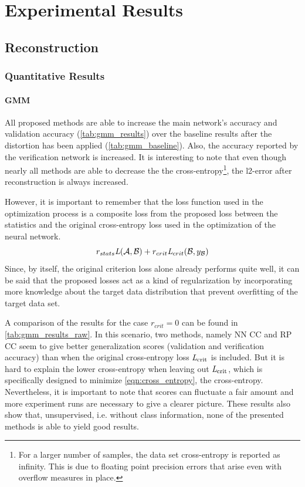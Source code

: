 \chapter{Experimental Results}
\label{chap:Results} 

\section{Reconstruction}

\subsection{Quantitative Results}

\subsubsection{GMM}

All proposed methods are able to increase the main network's accuracy and
validation accuracy (\cref{tab:gmm_results}) 
over the baseline results after the distortion has been applied (\cref{tab:gmm_baseline}).
Also, the accuracy reported by the verification network is increased.
It is interesting to note that even though nearly all methods 
are able to decrease the the cross-entropy\footnote{
For a larger number of samples, the data set cross-entropy is reported as infinity.
This is due to floating point precision errors that arise even with overflow measures in place.},
the l2-error after reconstruction is always increased.

However, it is important to remember that the loss function used in the optimization process
is a composite loss from the proposed loss between the statistics
and the original cross-entropy loss used in the optimization of the neural network.
\[
    r_{stats} \textit{L}(\mathcal A, \mathcal B) + r_{crit}\textit{L}_{crit}(\mathcal B, y_{\mathcal B})
\]
Since, by itself, the original criterion loss alone already performs quite well, 
it can be said that the proposed losses act as a kind of regularization 
by incorporating more knowledge about the target data distribution 
that prevent overfitting
of the target data set.

A comparison of the results for the case $r_{crit}=0$ can be found in \cref{tab:gmm_results_raw}.
In this scenario, two methods, namely NN CC and RP CC seem to give 
better generalization scores 
(validation and verification accuracy) than when the original cross-entropy loss 
$\textit{L}_\text{crit}$ is included.
But it is hard to explain the lower cross-entropy when leaving out 
$\textit{L}_\text{crit}$, which is specifically designed to minimize \cref{eqn:cross_entropy}, 
the cross-entropy.
Nevertheless, it is important to note that scores can fluctuate a fair amount and more 
experiment runs are necessary to give a clearer picture.
These results also show that, unsupervised, i.e. without class information, 
none of the presented methods is able to yield good results.


